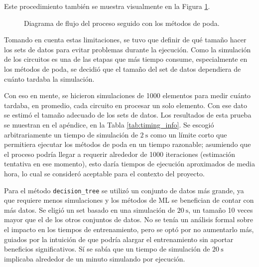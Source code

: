 Este procedimiento también se muestra visualmente en la Figura
\ref{fig:flow_poda}.

\begin{figure}[htb]
  \begin{center}
    
  \end{center}
  \caption{Diagrama de flujo del proceso seguido con los métodos de poda.}
  \label{fig:flow_poda}
\end{figure}

Tomando en cuenta estas limitaciones, se tuvo que definir de qué tamaño hacer
los sets de datos para evitar problemas durante la ejecución. Como la
simulación de los circuitos es una de las etapas que más tiempo consume,
especialmente en los métodos de poda, se decidió que el tamaño del set de datos
dependiera de cuánto tardaba la simulación.

Con eso en mente, se hicieron simulaciones de \num{1000} elementos para medir
cuánto tardaba, en promedio, cada circuito en procesar un solo elemento. Con
ese dato se estimó el tamaño adecuado de los sets de datos. Los resultados de
esta prueba se muestran en el apéndice, en la Tabla \ref{tab:timing_info}. Se
escogió arbitrariamente un tiempo de simulación de $\SI{2}{\second}$ como un
límite corto que permitiera ejecutar los métodos de poda en un tiempo
razonable; asumiendo que el proceso podría llegar a requerir alrededor de
\num{1000} iteraciones (estimación tentativa en ese momento), esto daría
tiempos de ejecución aproximados de media hora, lo cual se consideró aceptable
para el contexto del proyecto.

Para el método \texttt{decision\_tree} se utilizó un conjunto de datos más
grande, ya que requiere menos simulaciones y los métodos de ML se benefician de
contar con más datos. Se eligió un set basado en una simulación de
$\SI{20}{\second}$, un tamaño 10 veces mayor que el de los otros conjuntos de
datos. No se tenía un análisis formal sobre el impacto en los tiempos de
entrenamiento, pero se optó por no aumentarlo más, guiados por la intuición de
que podría alargar el entrenamiento sin aportar beneficios significativos. Sí
se sabía que un tiempo de simulación de $\SI{20}{\second}$ implicaba alrededor
de un minuto simulando por ejecución.

